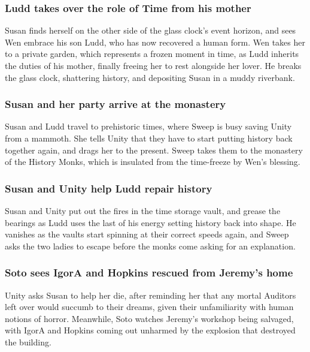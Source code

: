 \subsubsection{\Gls{Ludd} takes over the role of \Gls{Time} from his mother}
\Gls{Susan} finds herself on the other side of the glass clock's event horizon, and sees \Gls{Wen}
embrace his son \Gls{Ludd}, who has now recovered a human form. \Gls{Wen} takes her to a private
garden, which represents a frozen moment in time, as \Gls{Ludd} inherits the duties of his mother,
finally freeing her to rest alongside her lover. He breaks the glass clock, shattering history,
and depositing \Gls{Susan} in a muddy riverbank.

\subsubsection{\Gls{Susan} and her party arrive at the monastery}
\Gls{Susan} and \Gls{Ludd} travel to prehistoric times, where \Gls{Sweep} is busy saving \Gls{Unity}
from a mammoth. She tells \Gls{Unity} that they have to start putting history back together again,
and drags her to the present. \Gls{Sweep} takes them to the monastery of the History Monks, which
is insulated from the time-freeze by \Gls{Wen}'s blessing.

\subsubsection{\Gls{Susan} and \Gls{Unity} help \Gls{Ludd} repair history}
\Gls{Susan} and \Gls{Unity} put out the fires in the time storage vault, and grease the bearings as
\Gls{Ludd} uses the last of his energy setting history back into shape. He vanishes as the vaults
start spinning at their correct speeds again, and \Gls{Sweep} asks the two ladies to escape before
the monks come asking for an explanation.

\subsubsection{\Gls{Soto} sees \Gls{IgorA} and \Gls{Hopkins} rescued from \Gls{Jeremy}'s home}
\Gls{Unity} asks \Gls{Susan} to help her die, after reminding her that any mortal Auditors left
over would succumb to their dreams, given their unfamiliarity with human notions of horror.
Meanwhile, \Gls{Soto} watches \Gls{Jeremy}'s workshop being salvaged, with \Gls{IgorA} and
\Gls{Hopkins} coming out unharmed by the explosion that destroyed the building.

